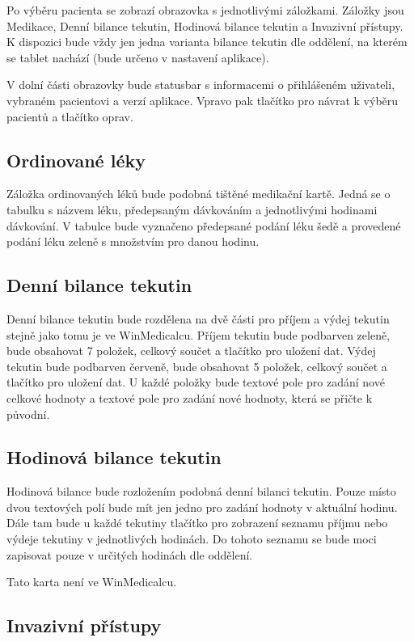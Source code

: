 Po výběru pacienta se zobrazí obrazovka s jednotlivými záložkami. Záložky jsou Medikace, Denní bilance tekutin, Hodinová bilance tekutin a Invazivní přístupy. K dispozici bude vždy jen jedna varianta bilance tekutin dle oddělení, na kterém se tablet nachází (bude určeno v nastavení aplikace).

V dolní části obrazovky bude statusbar s informacemi o přihlášeném uživateli, vybraném pacientovi a verzí aplikace. Vpravo pak tlačítko pro návrat k výběru pacientů a tlačítko oprav.

\subsection{Ordinované léky}

Záložka ordinovaných léků bude podobná tištěné medikační kartě. Jedná se o tabulku s názvem léku, předepsaným dávkováním a jednotlivými hodinami dávkování. V tabulce bude vyznačeno předepsané podání léku šedě a provedené podání léku zeleně s množstvím pro danou hodinu.

\subsection{Denní bilance tekutin}

Denní bilance tekutin bude rozdělena na dvě části pro příjem a výdej tekutin stejně jako tomu je ve WinMedicalcu. Příjem tekutin bude podbarven zeleně, bude obsahovat 7 položek, celkový součet a tlačítko pro uložení dat. Výdej tekutin bude podbarven červeně, bude obsahovat 5 položek, celkový součet a tlačítko pro uložení dat. U každé položky bude textové pole pro zadání nové celkové hodnoty a textové pole pro zadání nové hodnoty, která se přičte k původní.

\subsection{Hodinová bilance tekutin}

Hodinová bilance bude rozložením podobná denní bilanci tekutin. Pouze místo dvou textových polí bude mít jen jedno pro zadání hodnoty v aktuální hodinu. Dále tam bude u každé tekutiny tlačítko pro zobrazení seznamu příjmu nebo výdeje tekutiny v jednotlivých hodinách. Do tohoto seznamu se bude moci zapisovat pouze v určitých hodinách dle oddělení.

Tato karta není ve WinMedicalcu.

\subsection{Invazivní přístupy}

